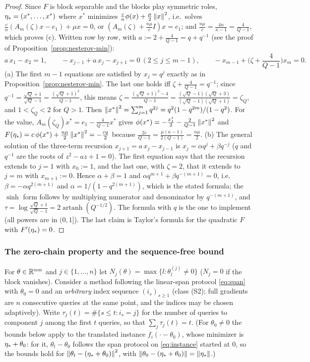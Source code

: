 \begin{proof}
Since $F$ is block separable and the blocks play symmetric roles, $\eta_\ast=(x^\ast,\dots,x^\ast)$ where $x^\ast$ minimizes $\frac cn\phi(x)+\frac\mu2\left\|x\right\|^2$, i.e.\ solves $\frac cn(A_m(\zeta)x-e_1)+\mu x=0$, or $(A_m(\zeta)+\frac{n\mu}cI)x=e_1$; and $\frac{n\mu}{c}=\frac{4n}{\kappa-1}=\frac4{Q-1}$, which proves (c). Written row by row, with $a:=2+\frac4{Q-1}=q+q^{-1}$ (see the proof of Proposition~\ref{prop:nesterov-min}):
\[
a\,x_1-x_2=1,\qquad -x_{j-1}+a\,x_j-x_{j+1}=0\ (2\le j\le m-1),\qquad -x_{m-1}+\Big(\zeta+\frac4{Q-1}\Big)x_m=0 .
\]
(a) The first $m-1$ equations are satisfied by $x_j=q^j$ exactly as in Proposition~\ref{prop:nesterov-min}. The last one holds iff $\zeta+\frac4{Q-1}=q^{-1}$; since $q^{-1}=\frac{\sqrt Q+1}{\sqrt Q-1}=\frac{(\sqrt Q+1)^2}{Q-1}$, this means $\zeta=\frac{(\sqrt Q+1)^2-4}{Q-1}=\frac{(\sqrt Q-1)(\sqrt Q+3)}{(\sqrt Q-1)(\sqrt Q+1)}=\zeta_Q$, and $1<\zeta_Q<2$ for $Q>1$. Then $\left\|x^\ast\right\|^2=\sum_{j=1}^mq^{2j}=q^2(1-q^{2m})/(1-q^2)$. For the value, $A_m(\zeta_Q)x^\ast=e_1-\frac4{Q-1}x^\ast$ gives $\phi(x^\ast)=-\frac{x_1^\ast}2-\frac2{Q-1}\left\|x^\ast\right\|^2$ and $F(\eta_\ast)=c\,\phi(x^\ast)+\frac{n\mu}2\left\|x^\ast\right\|^2=-\frac{cq}2$ because $\frac{2c}{Q-1}=\frac{\mu(\kappa-1)}{2(Q-1)}=\frac{n\mu}2$.
(b) The general solution of the three-term recursion $x_{j+1}=a\,x_j-x_{j-1}$ is $x_j=\alpha q^j+\beta q^{-j}$ ($q$ and $q^{-1}$ are the roots of $z^2-az+1=0$). The first equation says that the recursion extends to $j=1$ with $x_0:=1$, and the last one, with $\zeta=2$, that it extends to $j=m$ with $x_{m+1}:=0$. Hence $\alpha+\beta=1$ and $\alpha q^{m+1}+\beta q^{-(m+1)}=0$, i.e.\ $\beta=-\alpha q^{2(m+1)}$ and $\alpha=1/(1-q^{2(m+1)})$, which is the stated formula; the $\sinh$ form follows by multiplying numerator and denominator by $q^{-(m+1)}$, and $\tau=\log\frac{\sqrt Q+1}{\sqrt Q-1}=2\operatorname{artanh}(Q^{-1/2})$. The formula with $q$ is the one to implement (all powers are in $(0,1]$). The last claim is Taylor's formula for the quadratic $F$ with $F'(\eta_\ast)=0$.
\end{proof}

\subsubsection{The zero-chain property and the sequence-free bound}

For $\theta\in\mathbb{R}^{nm}$ and $j\in\{1,\dots,n\}$ let $N_j(\theta)=\max\{l:\theta^{(j)}_l\neq0\}$ ($N_j=0$ if the block vanishes). Consider a method following the linear-span protocol \eqref{eq:span} with $\theta_0=0$ and an \emph{arbitrary} index sequence $(i_s)_{s\ge1}$ (class (S2); full gradients are $n$ consecutive queries at the same point, and the indices may be chosen adaptively). Write $\tau_j(t)=\#\{s\le t: i_s=j\}$ for the number of queries to component $j$ among the first $t$ queries, so that $\sum_j\tau_j(t)=t$. (For $\theta_0\neq0$ the bounds below apply to the translated instance $f_i(\cdot-\theta_0)$, whose minimizer is $\eta_\ast+\theta_0$: for it, $\theta_t-\theta_0$ follows the span protocol on \eqref{eq:instance} started at $0$, so the bounds hold for $\left\|\theta_t-(\eta_\ast+\theta_0)\right\|^2$, with $\left\|\theta_0-(\eta_\ast+\theta_0)\right\|=\left\|\eta_\ast\right\|$.)

